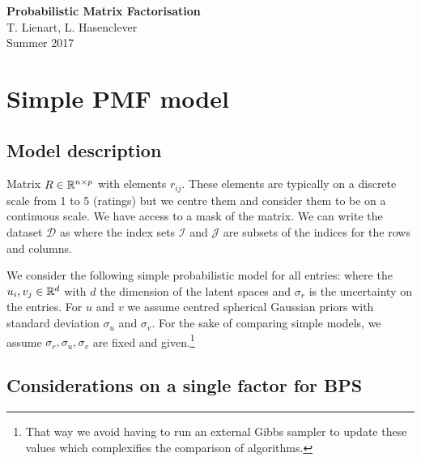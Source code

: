 

\setlength{\parindent}{0pt}



\begin{center}
	{\Large \bfseries Probabilistic Matrix Factorisation}\\[.5cm]
	{\large T. Lienart, L. Hasenclever}\\[.3cm]
	{Summer 2017}
\end{center}

\section{Simple PMF model}

\subsection{Model description}
Matrix $R\in\mathbb R^{n\times p}$ with elements $r_{ij}$. These elements are typically on a discrete scale from 1 to 5 (ratings) but we centre them and consider them to be on a continuous scale. We have access to a mask of the matrix. We can write the dataset $\mathcal D$ as
%
%
where the index sets $\mathcal I$ and $\mathcal J$ are subsets of the indices for the rows and columns.

We consider the following simple probabilistic model for all entries:
%
%
where the $u_{i},v_{j} \in \mathbb R^{d}$ with $d$ the dimension of the latent spaces and $\sigma_{r}$ is the uncertainty on the entries. For $u$ and $v$ we assume centred spherical Gaussian priors with standard deviation $\sigma_{u}$ and $\sigma_{v}$. For the sake of comparing simple models, we assume $\sigma_{r}, \sigma_{u}, \sigma_{v}$ are fixed and given.\footnote{That way we avoid having to run an external Gibbs sampler to update these values which complexifies the comparison of algorithms.} 

\subsection{Considerations on a single factor for BPS}

